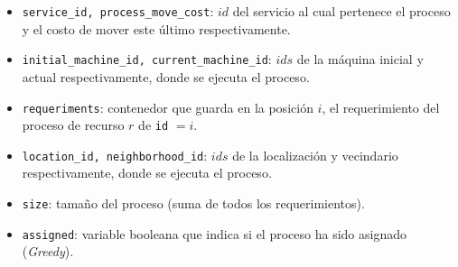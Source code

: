 \documentclass[../informe2.tex]{subfiles}
\begin{document}
\noindent\begin{minipage}{0.3\textwidth}
\end{minipage}\hfill
\begin{minipage}{0.6\textwidth}
	\small
	\begin{itemize}[leftmargin=*]
		\item \texttt{service\_id, process\_move\_cost}: $id$ del servicio al cual pertenece el proceso y el costo de mover este último respectivamente.
		\item \texttt{initial\_machine\_id, current\_machine\_id}: $ids$ de la máquina inicial y actual respectivamente, donde se ejecuta el proceso.
		\item \texttt{requeriments}: contenedor que guarda en la posición $i$, el requerimiento del proceso de recurso $r$ de \texttt{id} $=i$.
		\item \texttt{location\_id, neighborhood\_id}: $ids$ de la localización y vecindario respectivamente, donde se ejecuta el proceso.
		\item \texttt{size}: tamaño del proceso (suma de todos los requerimientos).
		\item \texttt{assigned}: variable booleana que indica si el proceso ha sido asignado (\textit{Greedy}).
	\end{itemize}
\end{minipage}

\bigskip
\end{document}
